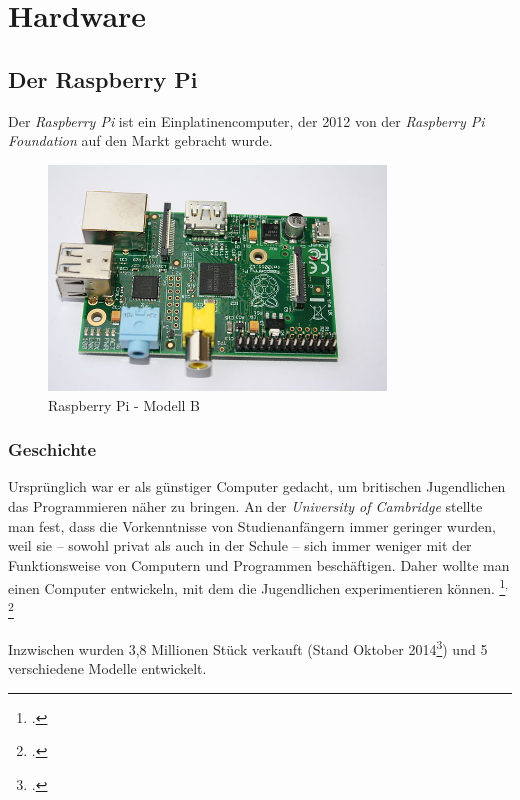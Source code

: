 \chapter{Hardware}
\label{cha:Hardware}

\section{Der Raspberry Pi}
\label{sec:Raspberry}
Der \textit{Raspberry Pi} ist ein Einplatinencomputer, der 2012 von der \textit{Raspberry Pi Foundation} auf den Markt gebracht wurde.

\begin{figure}[h]
  \centering
     \includegraphics[width=0.8\textwidth]{figures/raspberry.jpg}
 \caption[Raspberry Pi - Modell B]{Raspberry Pi - Modell B\footnotemark}
  \label{fig:raspberry}
\end{figure}

\subsection{Geschichte}
\label{subsec:Geschichte}
Ursprünglich war er als günstiger Computer gedacht, um britischen Jugendlichen das Programmieren näher zu bringen. An der \textit{University of Cambridge} stellte man fest, dass die Vorkenntnisse von Studienanfängern immer geringer wurden, weil sie -- sowohl privat als auch in der Schule -- sich immer weniger mit der Funktionsweise von Computern und Programmen beschäftigen. Daher wollte man einen Computer entwickeln, mit dem die Jugendlichen experimentieren können.
\footcite{aboutraspberry}$^,$
\footcite[Geschichte]{wiki:raspberry}

Inzwischen wurden 3,8 Millionen Stück verkauft (Stand Oktober 2014\footcite{verkauf}) und 5 verschiedene Modelle entwickelt.

